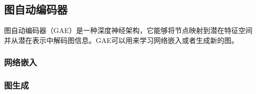 \subsection{图自动编码器}
图自动编码器（GAE）是一种深度神经架构，它能够将节点映射到潜在特征空间并从潜在表示中解码图信息。GAE可以用来学习网络嵌入或者生成新的图。

\subsubsection{网络嵌入}



\subsubsection{图生成}
